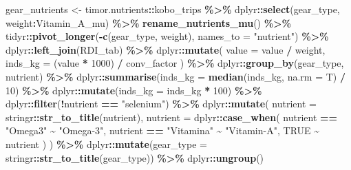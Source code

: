 \documentclass[
]{book}
\newenvironment{Shaded}{\begin{snugshade}}{\end{snugshade}}
\newcommand{\AttributeTok}[1]{\textcolor[rgb]{0.13,0.29,0.53}{#1}}
\newcommand{\ConstantTok}[1]{\textcolor[rgb]{0.56,0.35,0.01}{#1}}
\newcommand{\DecValTok}[1]{\textcolor[rgb]{0.00,0.00,0.81}{#1}}
\newcommand{\FunctionTok}[1]{\textcolor[rgb]{0.13,0.29,0.53}{\textbf{#1}}}
\newcommand{\NormalTok}[1]{#1}
\newcommand{\OtherTok}[1]{\textcolor[rgb]{0.56,0.35,0.01}{#1}}
\newcommand{\SpecialCharTok}[1]{\textcolor[rgb]{0.81,0.36,0.00}{\textbf{#1}}}
\newcommand{\StringTok}[1]{\textcolor[rgb]{0.31,0.60,0.02}{#1}}
\begin{document}
\begin{Shaded}
\begin{Highlighting}[]
\NormalTok{gear\_nutrients }\OtherTok{\textless{}{-}}
\NormalTok{  timor.nutrients}\SpecialCharTok{::}\NormalTok{kobo\_trips }\SpecialCharTok{\%\textgreater{}\%}
\NormalTok{  dplyr}\SpecialCharTok{::}\FunctionTok{select}\NormalTok{(gear\_type, weight}\SpecialCharTok{:}\NormalTok{Vitamin\_A\_mu) }\SpecialCharTok{\%\textgreater{}\%}
  \FunctionTok{rename\_nutrients\_mu}\NormalTok{() }\SpecialCharTok{\%\textgreater{}\%}
\NormalTok{  tidyr}\SpecialCharTok{::}\FunctionTok{pivot\_longer}\NormalTok{(}\SpecialCharTok{{-}}\FunctionTok{c}\NormalTok{(gear\_type, weight), }\AttributeTok{names\_to =} \StringTok{"nutrient"}\NormalTok{) }\SpecialCharTok{\%\textgreater{}\%}
\NormalTok{  dplyr}\SpecialCharTok{::}\FunctionTok{left\_join}\NormalTok{(RDI\_tab) }\SpecialCharTok{\%\textgreater{}\%}
\NormalTok{  dplyr}\SpecialCharTok{::}\FunctionTok{mutate}\NormalTok{(}
    \AttributeTok{value =}\NormalTok{ value }\SpecialCharTok{/}\NormalTok{ weight,}
    \AttributeTok{inds\_kg =}\NormalTok{ (value }\SpecialCharTok{*} \DecValTok{1000}\NormalTok{) }\SpecialCharTok{/}\NormalTok{ conv\_factor}
\NormalTok{  ) }\SpecialCharTok{\%\textgreater{}\%}
\NormalTok{  dplyr}\SpecialCharTok{::}\FunctionTok{group\_by}\NormalTok{(gear\_type, nutrient) }\SpecialCharTok{\%\textgreater{}\%}
\NormalTok{  dplyr}\SpecialCharTok{::}\FunctionTok{summarise}\NormalTok{(}\AttributeTok{inds\_kg =} \FunctionTok{median}\NormalTok{(inds\_kg, }\AttributeTok{na.rm =}\NormalTok{ T) }\SpecialCharTok{/} \DecValTok{10}\NormalTok{) }\SpecialCharTok{\%\textgreater{}\%}
\NormalTok{  dplyr}\SpecialCharTok{::}\FunctionTok{mutate}\NormalTok{(}\AttributeTok{inds\_kg =}\NormalTok{ inds\_kg }\SpecialCharTok{*} \DecValTok{100}\NormalTok{) }\SpecialCharTok{\%\textgreater{}\%}
\NormalTok{  dplyr}\SpecialCharTok{::}\FunctionTok{filter}\NormalTok{(}\SpecialCharTok{!}\NormalTok{nutrient }\SpecialCharTok{==} \StringTok{"selenium"}\NormalTok{) }\SpecialCharTok{\%\textgreater{}\%}
\NormalTok{  dplyr}\SpecialCharTok{::}\FunctionTok{mutate}\NormalTok{(}
    \AttributeTok{nutrient =}\NormalTok{ stringr}\SpecialCharTok{::}\FunctionTok{str\_to\_title}\NormalTok{(nutrient),}
    \AttributeTok{nutrient =}\NormalTok{ dplyr}\SpecialCharTok{::}\FunctionTok{case\_when}\NormalTok{(}
\NormalTok{      nutrient }\SpecialCharTok{==} \StringTok{"Omega3"} \SpecialCharTok{\textasciitilde{}} \StringTok{"Omega{-}3"}\NormalTok{,}
\NormalTok{      nutrient }\SpecialCharTok{==} \StringTok{"Vitamina"} \SpecialCharTok{\textasciitilde{}} \StringTok{"Vitamin{-}A"}\NormalTok{,}
      \ConstantTok{TRUE} \SpecialCharTok{\textasciitilde{}}\NormalTok{ nutrient}
\NormalTok{    )}
\NormalTok{  ) }\SpecialCharTok{\%\textgreater{}\%}
\NormalTok{  dplyr}\SpecialCharTok{::}\FunctionTok{mutate}\NormalTok{(}\AttributeTok{gear\_type =}\NormalTok{ stringr}\SpecialCharTok{::}\FunctionTok{str\_to\_title}\NormalTok{(gear\_type)) }\SpecialCharTok{\%\textgreater{}\%}
\NormalTok{  dplyr}\SpecialCharTok{::}\FunctionTok{ungroup}\NormalTok{()}


\end{Highlighting}
\end{Shaded}
\end{document}
